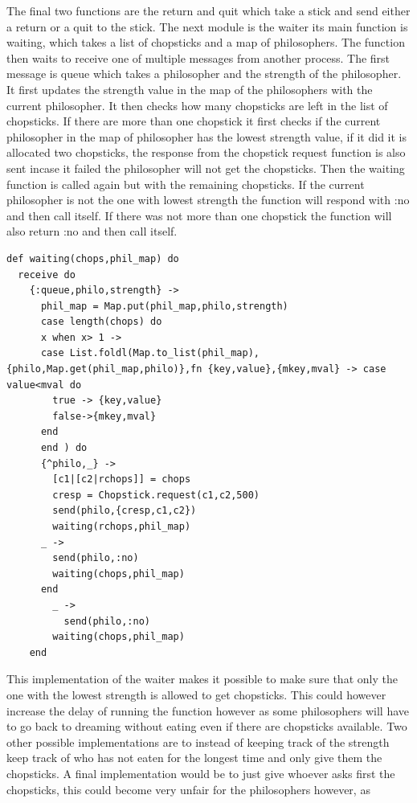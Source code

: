 \documentclass[a4paper,11pt]{article}
\begin{document}
The final two functions are the return and quit which take a stick and send either a return or a quit to the stick.
The next module is the waiter its main function is waiting, which takes a list of chopsticks and a map of philosophers. 
The function then waits to receive one of multiple messages from another process. The first message is queue which takes a philosopher and the strength of the philosopher. It first updates the strength value in the map of the philosophers with the current philosopher. It then checks how many chopsticks are left in the list of chopsticks.
If there are more than one chopstick it first checks if the current philosopher in the map of philosopher has the lowest strength value, if it did it is allocated two chopsticks, the response from the chopstick request function is also sent incase it failed the philosopher will not get the chopsticks. Then the waiting function is called again but with the remaining chopsticks. If the current philosopher is not the one with lowest strength the function will respond with :no and then call itself. 
If there was not more than one chopstick the function will also return :no and then call itself. 
\begin{verbatim}
def waiting(chops,phil_map) do
  receive do
    {:queue,philo,strength} ->
      phil_map = Map.put(phil_map,philo,strength)
      case length(chops) do
      x when x> 1 ->
      case List.foldl(Map.to_list(phil_map),{philo,Map.get(phil_map,philo)},fn {key,value},{mkey,mval} -> case value<mval do
        true -> {key,value}
        false->{mkey,mval}
      end
      end ) do
      {^philo,_} ->
        [c1|[c2|rchops]] = chops
        cresp = Chopstick.request(c1,c2,500)
        send(philo,{cresp,c1,c2})
        waiting(rchops,phil_map)
      _ ->
        send(philo,:no)
        waiting(chops,phil_map)
      end
        _ ->
          send(philo,:no)
        waiting(chops,phil_map)
    end
\end{verbatim}
This implementation of the waiter makes it possible to make sure that only the one with the lowest strength is allowed to get chopsticks. 
This could however increase the delay of running the function however as some philosophers will have to go back to dreaming without eating even if there are chopsticks available. 
Two other possible implementations are to instead of keeping track of the strength keep track of who has not eaten for the longest time and only give them the chopsticks. A final implementation would be to just give whoever asks first the chopsticks, this could become very unfair for the philosophers however, as 
\end{document}
